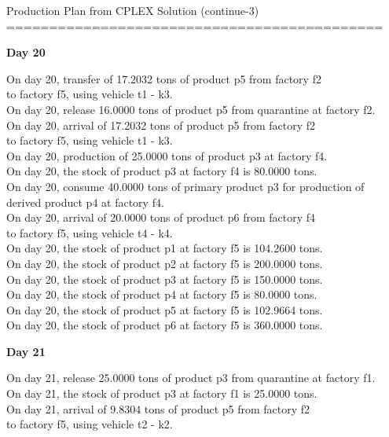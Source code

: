 \begin{table}[H] 
Production Plan from CPLEX Solution (continue-3)
============================================
\vspace{-2.5em}
\begin{multicols}{2}
\tiny
\textbf{Day 20}
\vspace{-1.6em}
\begin{tabbing}
On day 20, transfer of 17.2032 tons of product p5 from factory f2 \\ to factory f5, using vehicle t1 - k3. \\
On day 20, release 16.0000 tons of product p5 from quarantine at factory f2. \\
On day 20, arrival of 17.2032 tons of product p5 from factory f2 \\ to factory f5, using vehicle t1 - k3. \\
On day 20, production of 25.0000 tons of product p3 at factory f4. \\
On day 20, the stock of product p3 at factory f4 is 80.0000 tons. \\
On day 20, consume 40.0000 tons of primary product p3 for production of derived product p4 at factory f4. \\
On day 20, arrival of 20.0000 tons of product p6 from factory f4 \\ to factory f5, using vehicle t4 - k4. \\
On day 20, the stock of product p1 at factory f5 is 104.2600 tons. \\
On day 20, the stock of product p2 at factory f5 is 200.0000 tons. \\
On day 20, the stock of product p3 at factory f5 is 150.0000 tons. \\
On day 20, the stock of product p4 at factory f5 is 80.0000 tons. \\
On day 20, the stock of product p5 at factory f5 is 102.9664 tons. \\
On day 20, the stock of product p6 at factory f5 is 360.0000 tons. \\
\end{tabbing} \vspace{-2.0em}
\textbf{Day 21}
\vspace{-1.6em}
\begin{tabbing}
On day 21, release 25.0000 tons of product p3 from quarantine at factory f1. \\
On day 21, the stock of product p3 at factory f1 is 25.0000 tons. \\
On day 21, arrival of 9.8304 tons of product p5 from factory f2 \\ to factory f5, using vehicle t2 - k2. \\

\end{tabbing}
\end{multicols}
\end{table}
